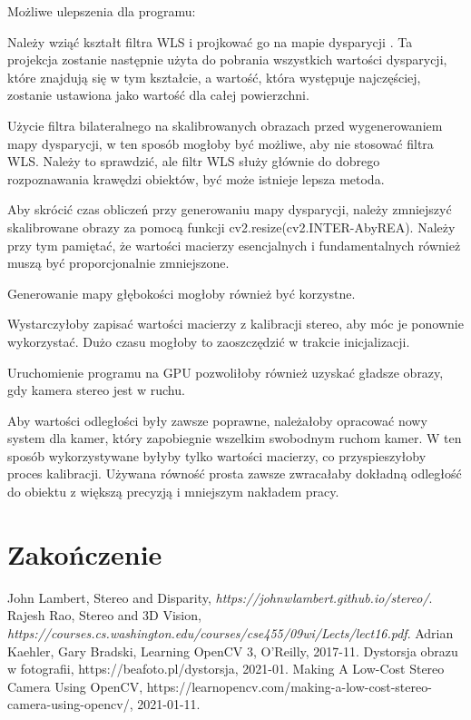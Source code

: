 \documentclass[magisterska]{pracadypl}
\begin{document}
Możliwe ulepszenia dla programu:

Należy wziąć kształt filtra WLS i projkować go na mapie dysparycji \cite{rao}. Ta projekcja zostanie następnie użyta do pobrania wszystkich wartości dysparycji, które znajdują się w tym kształcie, a wartość, która występuje najczęściej, zostanie ustawiona jako wartość dla całej powierzchni.

Użycie filtra bilateralnego na skalibrowanych obrazach przed wygenerowaniem mapy dysparycji, w ten sposób mogłoby być możliwe, aby nie stosować filtra WLS. Należy to sprawdzić, ale filtr WLS służy głównie do dobrego rozpoznawania krawędzi obiektów, być może istnieje lepsza metoda.

Aby skrócić czas obliczeń przy generowaniu mapy dysparycji, należy zmniejszyć skalibrowane obrazy za pomocą funkcji cv2.resize(cv2.INTER-AbyREA). Należy przy tym pamiętać, że wartości macierzy esencjalnych i fundamentalnych również muszą być proporcjonalnie zmniejszone.

Generowanie mapy głębokości mogłoby również być korzystne.

Wystarczyłoby zapisać wartości macierzy z kalibracji stereo, aby móc je ponownie wykorzystać. Dużo czasu mogłoby to zaoszczędzić w trakcie inicjalizacji.

Uruchomienie programu na GPU pozwoliłoby również uzyskać gładsze obrazy, gdy kamera stereo jest w ruchu.

Aby wartości odległości były zawsze poprawne, należałoby opracować nowy system dla kamer, który zapobiegnie wszelkim swobodnym ruchom kamer. W ten sposób wykorzystywane byłyby tylko wartości macierzy, co przyspieszyłoby proces kalibracji. Używana równość prosta zawsze zwracałaby dokładną odległość do obiektu z większą precyzją i mniejszym nakładem pracy.

\chapter{Zakończenie}

\listoffigures

\begin{thebibliography}{7}

 John Lambert, Stereo and Disparity, \textit{https://johnwlambert.github.io/stereo/}.
 Rajesh Rao, Stereo and 3D Vision, \textit{https://courses.cs.washington.edu/courses/cse455/09wi/Lects/lect16.pdf}.
 Adrian Kaehler, Gary Bradski, Learning OpenCV 3, O'Reilly, 2017-11.
 Dystorsja obrazu w fotografii, https://beafoto.pl/dystorsja, 2021-01.
 Making A Low-Cost Stereo Camera Using OpenCV, https://learnopencv.com/making-a-low-cost-stereo-camera-using-opencv/, 2021-01-11.

\end{thebibliography}
\end{document}

